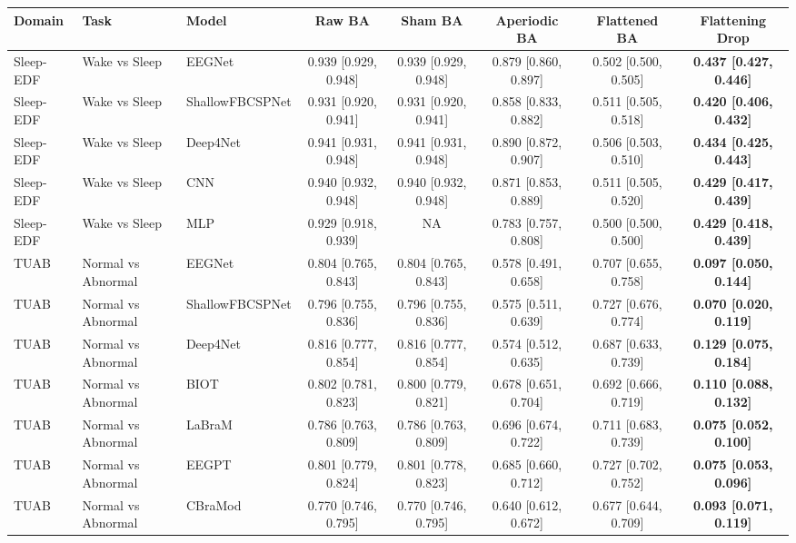 \begin{tabular}{lllccccc}
\toprule
Domain & Task & Model & Raw BA & Sham BA & Aperiodic BA & Flattened BA & Flattening Drop \\
\midrule
Sleep-EDF & Wake vs Sleep & EEGNet & 0.939 [0.929, 0.948] & 0.939 [0.929, 0.948] & 0.879 [0.860, 0.897] & 0.502 [0.500, 0.505] & \textbf{0.437 [0.427, 0.446]} \\
Sleep-EDF & Wake vs Sleep & ShallowFBCSPNet & 0.931 [0.920, 0.941] & 0.931 [0.920, 0.941] & 0.858 [0.833, 0.882] & 0.511 [0.505, 0.518] & \textbf{0.420 [0.406, 0.432]} \\
Sleep-EDF & Wake vs Sleep & Deep4Net & 0.941 [0.931, 0.948] & 0.941 [0.931, 0.948] & 0.890 [0.872, 0.907] & 0.506 [0.503, 0.510] & \textbf{0.434 [0.425, 0.443]} \\
Sleep-EDF & Wake vs Sleep & CNN & 0.940 [0.932, 0.948] & 0.940 [0.932, 0.948] & 0.871 [0.853, 0.889] & 0.511 [0.505, 0.520] & \textbf{0.429 [0.417, 0.439]} \\
Sleep-EDF & Wake vs Sleep & MLP & 0.929 [0.918, 0.939] & NA & 0.783 [0.757, 0.808] & 0.500 [0.500, 0.500] & \textbf{0.429 [0.418, 0.439]} \\
\midrule
TUAB & Normal vs Abnormal & EEGNet & 0.804 [0.765, 0.843] & 0.804 [0.765, 0.843] & 0.578 [0.491, 0.658] & 0.707 [0.655, 0.758] & \textbf{0.097 [0.050, 0.144]} \\
TUAB & Normal vs Abnormal & ShallowFBCSPNet & 0.796 [0.755, 0.836] & 0.796 [0.755, 0.836] & 0.575 [0.511, 0.639] & 0.727 [0.676, 0.774] & \textbf{0.070 [0.020, 0.119]} \\
TUAB & Normal vs Abnormal & Deep4Net & 0.816 [0.777, 0.854] & 0.816 [0.777, 0.854] & 0.574 [0.512, 0.635] & 0.687 [0.633, 0.739] & \textbf{0.129 [0.075, 0.184]} \\
TUAB & Normal vs Abnormal & BIOT & 0.802 [0.781, 0.823] & 0.800 [0.779, 0.821] & 0.678 [0.651, 0.704] & 0.692 [0.666, 0.719] & \textbf{0.110 [0.088, 0.132]} \\
TUAB & Normal vs Abnormal & LaBraM & 0.786 [0.763, 0.809] & 0.786 [0.763, 0.809] & 0.696 [0.674, 0.722] & 0.711 [0.683, 0.739] & \textbf{0.075 [0.052, 0.100]} \\
TUAB & Normal vs Abnormal & EEGPT & 0.801 [0.779, 0.824] & 0.801 [0.778, 0.823] & 0.685 [0.660, 0.712] & 0.727 [0.702, 0.752] & \textbf{0.075 [0.053, 0.096]} \\
TUAB & Normal vs Abnormal & CBraMod & 0.770 [0.746, 0.795] & 0.770 [0.746, 0.795] & 0.640 [0.612, 0.672] & 0.677 [0.644, 0.709] & \textbf{0.093 [0.071, 0.119]} \\

\end{tabular}
